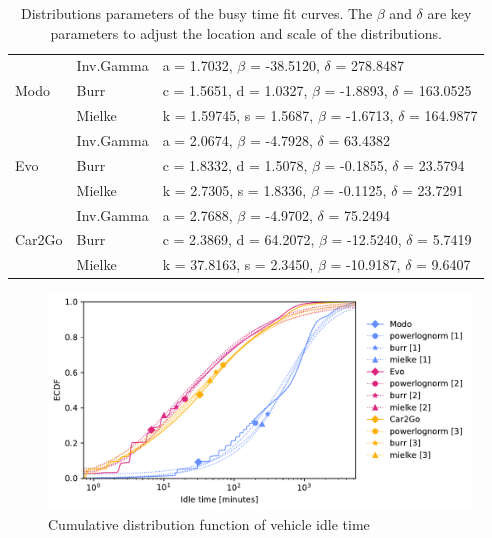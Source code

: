 \begin{table}
\centering
\setlength{\tabcolsep}{2.3pt}
	\begin{tabular}{lll}
	\hline
	\multirow{3}{*}{Modo}   & Inv.Gamma       & a = 1.7032,  $\beta$ = -38.5120,  $\delta$ = 278.8487                        \\
	                        & Burr                & c = 1.5651, d = 1.0327,  $\beta$ = -1.8893, $\delta$ = 163.0525 \\
	                        & Mielke & k = 1.59745, s = 1.5687,  $\beta$ = -1.6713, $\delta$ = 164.9877 \\ \hline
	\multirow{3}{*}{Evo}    & Inv.Gamma       & a = 2.0674, $\beta$ = -4.7928, $\delta$ = 63.4382                          \\
	                        & Burr                & c = 1.8332, d = 1.5078, $\beta$ = -0.1855, $\delta$ = 23.5794   \\
	                        & Mielke & k = 2.7305, s = 1.8336, $\beta$ = -0.1125, $\delta$ = 23.7291 \\ \hline
	\multirow{3}{*}{Car2Go} & Inv.Gamma       & a = 2.7688, $\beta$ = -4.9702, $\delta$ = 75.2494                           \\
	                        & Burr                & c = 2.3869, d = 64.2072, $\beta$ = -12.5240, $\delta$ = 5.7419   \\
	                        & Mielke & k = 37.8163, s = 2.3450, $\beta$ = -10.9187, $\delta$ = 9.6407   \\ \hline
	\end{tabular}
\caption{Distributions parameters of the busy time fit curves. The $\beta$ and $\delta$ are key parameters to adjust the location and scale of the distributions.}
\label{table:fit_busy}
\end{table}

\begin{figure}
   \centering
   \includegraphics[width=0.85\columnwidth]{images_test/CDF_Fit_idle_final.pdf}
   \caption{Cumulative distribution function of vehicle idle time}
   \label{fig:idle_all_eCDF}
\end{figure}


